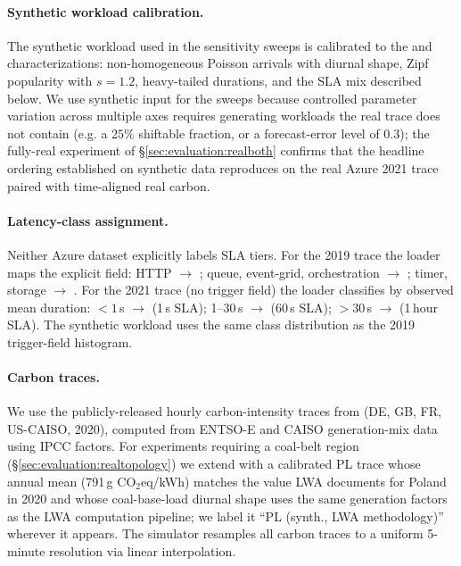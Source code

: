 \paragraph{Synthetic workload calibration.} The synthetic workload
used in the sensitivity sweeps is calibrated to the
\citet{shahrad2020serverless} and \citet{zhang2021faster}
characterizations: non-homogeneous Poisson arrivals with diurnal
shape, Zipf popularity with $s = 1.2$, heavy-tailed durations, and
the SLA mix described below. We use synthetic input for the sweeps
because controlled parameter variation across multiple axes requires
generating workloads the real trace does not contain (e.g. a $25\%$
shiftable fraction, or a forecast-error level of $0.3$); the
fully-real experiment of \S\ref{sec:evaluation:realboth} confirms that
the headline ordering established on synthetic data reproduces on the
real Azure 2021 trace paired with time-aligned real carbon.

\paragraph{Latency-class assignment.} Neither Azure dataset
explicitly labels SLA tiers. For the 2019 trace the loader maps the
explicit  field: HTTP $\to$ \Interactive; queue,
event-grid, orchestration $\to$ \Deferrable; timer, storage $\to$
\Background. For the 2021 trace (no trigger field) the loader
classifies by observed mean duration: $<1$\,s $\to$ \Interactive{}
(1\,s SLA); 1--30\,s $\to$ \Deferrable{} (60\,s SLA); $>30$\,s $\to$
\Background{} (1\,hour SLA). The synthetic workload uses the same
class distribution as the 2019 trigger-field histogram.

\paragraph{Carbon traces.} We use the publicly-released hourly
carbon-intensity traces from \citet{wiesner2021lets,lwa} (DE, GB, FR,
US-CAISO, 2020), computed from ENTSO-E and CAISO generation-mix data
using IPCC factors. For experiments requiring a coal-belt region
(\S\ref{sec:evaluation:realtopology}) we extend with a calibrated
PL trace whose annual mean (791\,g CO$_2$eq/kWh) matches the value
LWA documents for Poland in 2020 and whose coal-base-load diurnal
shape uses the same generation factors as the LWA computation
pipeline; we label it ``PL (synth., LWA methodology)'' wherever it
appears. The simulator resamples all carbon traces to a uniform
5-minute resolution via linear interpolation.

